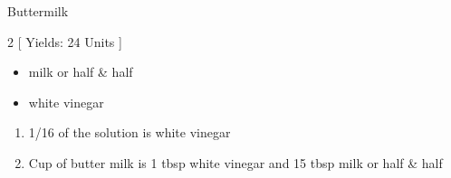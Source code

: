 \begin{Large}
    Buttermilk
\end{Large}

\begin{scriptsize}
\begin{multicols}{2}
[
\vspace{1em}
Yields: 24 Units
\vspace{-1.5em}
]

\begin{itemize}
    \item milk or half \& half
    \item white vinegar
\end{itemize}
\end{multicols}
\end{scriptsize}

\begin{footnotesize}
\begin{enumerate}
    \item 1/16 of the solution is white vinegar
    \item Cup of butter milk is 1 tbsp white vinegar and 15 tbsp milk or half \& half
\end{enumerate}
\end{footnotesize}

\vspace{2em}
